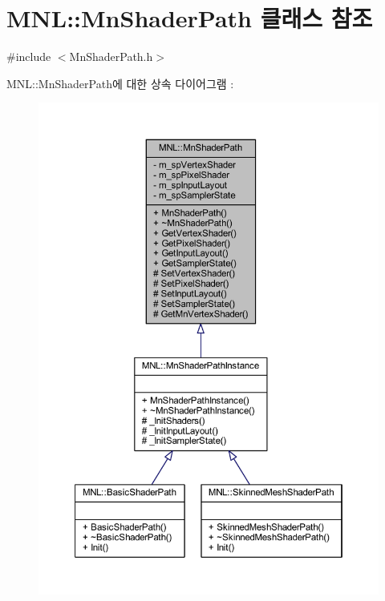 \hypertarget{class_m_n_l_1_1_mn_shader_path}{}\section{M\+NL\+:\+:Mn\+Shader\+Path 클래스 참조}
\label{class_m_n_l_1_1_mn_shader_path}


{\ttfamily \#include $<$Mn\+Shader\+Path.\+h$>$}



M\+NL\+:\+:Mn\+Shader\+Path에 대한 상속 다이어그램 \+: \nopagebreak
\begin{figure}[H]
\begin{center}
\leavevmode
\includegraphics[width=350pt]{class_m_n_l_1_1_mn_shader_path__inherit__graph}
\end{center}
\end{figure}


